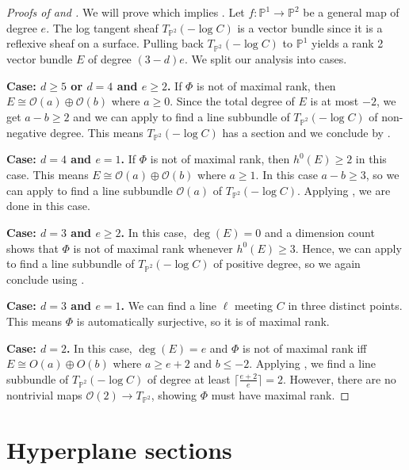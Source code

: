 \documentclass[11pt,reqno]{amsart}
\theoremstyle{plain}
\theoremstyle{definition}
\theoremstyle{remark}
\numberwithin{equation}{section}
\renewcommand{\to}{{\longrightarrow}}
\numberwithin{equation}{section}
\newcommand{\OO}{\mathscr{O}}
\newcommand{\PP}{\mathbb{P}}
\begin{document}
\begin{proof}[Proofs of  and ]
We will prove  which implies . Let $f: \mathbb{P}^1\to \mathbb{P}^2$ be a general map of degree $e$. The log tangent sheaf $T_{\PP^2}(-\log C)$ is a vector bundle since it is a reflexive sheaf on a surface. Pulling back $T_{\PP^2}(-\log C)$ to $\PP^1$ yields a rank 2 vector bundle $E$ of degree $(3-d)e$. We split our analysis into cases.

\textbf{Case: $d\geq 5$ or $d=4$ and $e\geq 2$.} If $\Phi$ is not of maximal rank, then $E\cong \OO(a)\oplus \OO(b)$ where $a\geq 0$. Since the total degree of $E$ is at most $-2$, we get $a-b\geq 2$ and we can apply  to find a line subbundle of $T_{\PP^2}(-\log C)$ of non-negative degree. This means $T_{\PP^2}(-\log C)$ has a section and we conclude by .

\textbf{Case: $d=4$ and $e=1$.} If $\Phi$ is not of maximal rank, then $h^0(E)\geq 2$ in this case. This means $E\cong \OO(a)\oplus \OO(b)$ where $a\geq 1$. In this case $a-b\geq 3$, so we can apply  to find a line subbundle $\OO(a)$ of  $T_{\PP^2}(-\log C)$. Applying , we are done in this case.

\textbf{Case: $d=3$ and $e\geq 2$.} In this case, $\deg(E)=0$ and a dimension count shows that $\Phi$ is not of maximal rank whenever $h^0(E)\geq 3$. Hence, we can apply  to find a line subbundle of $T_{\PP^2}(-\log C)$ of positive degree, so we again conclude using .

\textbf{Case: $d=3$ and $e=1$.} We can find a line $\ell$ meeting $C$ in three distinct points. This means $\Phi$ is automatically surjective, so it is of maximal rank.

\textbf{Case: $d=2$.} In this case, $\deg(E)=e$ and $\Phi$ is not of maximal rank iff $E\cong O(a)\oplus O(b)$ where $a\geq e+2$ and $b\leq -2$. Applying , we find a line subbundle of $T_{\PP^2}(-\log C)$ of degree at least $\lceil\frac{e+2}{e}\rceil=2$. However, there are no nontrivial maps $\OO(2)\to T_{\PP^2}$, showing $\Phi$ must have maximal rank.
\end{proof}

\section{Hyperplane sections}
\end{document}
